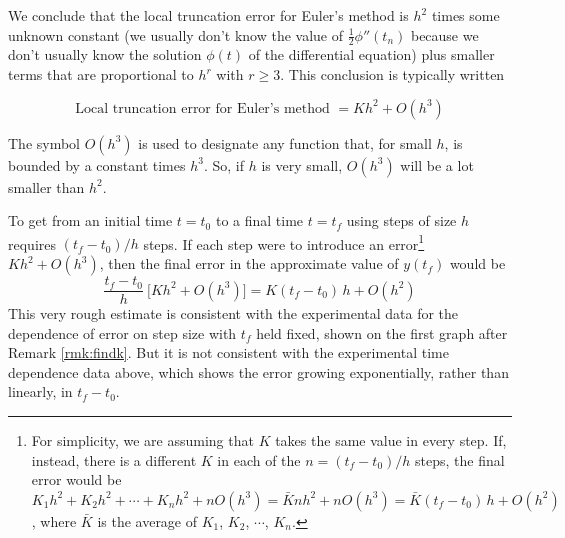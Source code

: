 We conclude that the local truncation error for Euler's method is $h^2$
times some unknown constant (we usually don't know the value of 
$\frac{1}{2} \phi''(t_n)$ because we don't usually know the solution 
$\phi(t)$ of the differential equation)
plus smaller terms that are proportional to $h^r$ with $r\ge 3$. 
This conclusion is typically written
\begin{impeqn}\label{eqn local trunc error Euler}
\begin{equation*}
\text{Local truncation error for Euler's method }= Kh^2+O(h^3)
\end{equation*}
\end{impeqn}
The symbol $O(h^3)$ is used to designate any function that, for small $h$,
is bounded by a constant times $h^3$. So, if $h$ is very small, $O(h^3)$ will be a lot smaller than $h^2$.

To get from an initial time $t=t_0$
to a final time $t=t_f$ using steps of size $h$ requires $(t_f-t_0)/h$ steps.
If each step were to introduce an error\footnote{For simplicity, we are assuming that $K$ takes the same value in every step. If, instead, there is a different $K$ in each of the $n=(t_f-t_0)/h$ steps, the final error would be $K_1h^2+K_2h^2+\cdots+K_nh^2+n O(h^3)= \bar K nh^2+n O(h^3)= \bar K(t_f-t_0)\, h+O(h^2)$, where $\bar K$ is the average of $K_1$, $K_2$, $\cdots$, $K_n$.} $Kh^2+O(h^3)$, then the final error in
the approximate value of $y(t_f)$ would be 
\begin{equation*}
\frac{t_f-t_0}{h}\ \Big[Kh^2+O(h^3)\Big]
           = K(t_f-t_0)\, h+O(h^2)
\end{equation*}
This very rough estimate is consistent with the experimental data for 
the dependence of error on step size with $t_f$ held fixed, shown on the 
first graph after Remark \ref{rmk:findk}. 
But it is not consistent with the experimental time dependence data above,
which shows the error growing exponentially, rather than linearly, in $t_f-t_0$.
 
